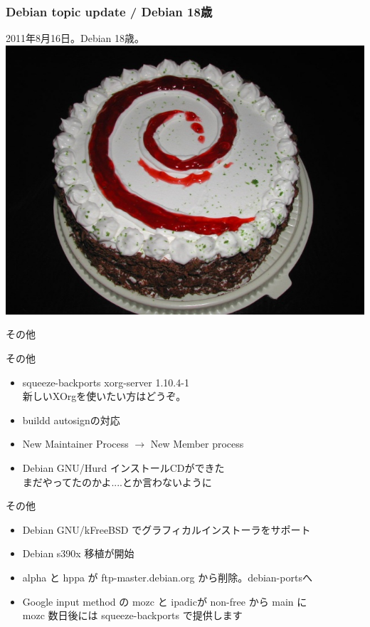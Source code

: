 \begin{frame}
 \frametitle{Debian topic update / Debian 18歳}
\begin{center}

\Large{2011年8月16日。Debian 18歳。}\\
\includegraphics[width=0.8\hsize]{image201111/debian-cake.jpg}
\end{center}
\end{frame}

\begin{frame}
\begin{center}
\LARGE{その他}
\end{center}
\end{frame}

\begin{frame}{その他}
\begin{itemize}[<+->]
\item squeeze-backports xorg-server 1.10.4-1\\
新しいXOrgを使いたい方はどうぞ。

\item buildd autosignの対応
\item New Maintainer Process $\rightarrow$ New Member process 
\item Debian GNU/Hurd インストールCDができた\\\pause
まだやってたのかよ....とか言わないように\pause
\end{itemize}
\end{frame}


\begin{frame}{その他}
\begin{itemize}[<+->]
\item Debian GNU/kFreeBSD でグラフィカルインストーラをサポート
\item Debian s390x 移植が開始
\item alpha と hppa が ftp-master.debian.org から削除。debian-portsへ
\item Google input method の mozc と ipadicが non-free から main に\\
mozc 数日後には squeeze-backports で提供します

\end{itemize}
\end{frame}

